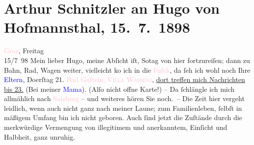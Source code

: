 

               \section[Arthur Schnitzler an Hugo von Hofmannsthal, 15. 7. 1898]{ Arthur Schnitzler an Hugo von Hofmannsthal, 15. 7. 1898}\nopagebreak{}\rehead{ }\normalsize\beginnumbering{} \toendnotes[C]{\smallbreak\pagebreak[2]} 
\toendnotes[C]{\smallbreak}\pstart
           \raggedleft{}{\pb}\textcolor{pink}{Graz}{}\ledrightnote{\textcolor{pink}{Graz}}, Freitag{\\}15/7 98\pend
           \pstart
           Mein lieber Hugo, meine Abſicht iſt, So{\geminationn}tag von hier fortzureiſen; dann zu
                    Bahn, Rad, Wagen weiter, vielleicht ko{\geminationm} ich in die
                        \textcolor{pink}{Fuſch}{}\ledrightnote{\textcolor{pink}{Bad Fusch}}, da ſeh ich wohl noch Ihre \textcolor{blue}{Eltern}{}, Do{\geminationn}erſtag 21.{ }\textcolor{pink}{\introOben{}Bad\introOben{} Gaſtein, \textsc{Villa
                            Wassing}}{}\ledrightnote{\textcolor{pink}{Villa Dr. Wassing}}, \uline{dort treffen mich Nachrichten bis
                            23.} (Bei meiner \textcolor{blue}{Mama}{}). \introOben{}(Alſo nicht offne Karte!)\introOben{} – Da{\geminationn}{ }ſchlängle ich mich allmählich nach \textcolor{pink}{Salzburg}{}\ledrightnote{\textcolor{pink}{Salzburg}} – und weiteres hören Sie noch. – Die Zeit
                    hier vergeht leidlich, wenn auch nicht ganz nach meiner Laune; zum
                    Familienleben, {\pb}ſelbſt in mäßigem Umfang bin ich
                    nicht geboren. Auch ſind jetzt die Zuſtände durch die merkwürdige Vermengung von
                    illegitimem und anerkanntem, Einſicht und Halbheit, ganz unruhig.\pend
           \pstart
